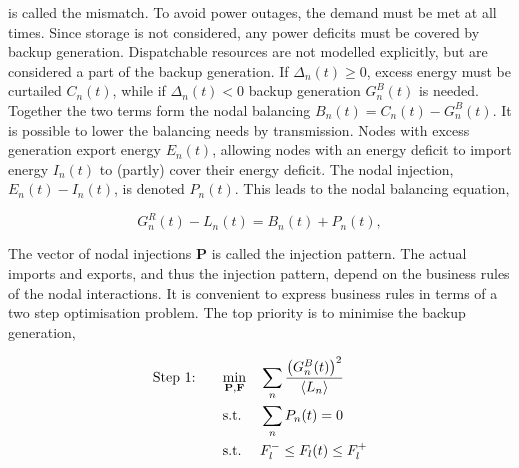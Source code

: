 \documentclass[a4paper, 5p, sort&compress]{elsarticle}%
\newcommand{\mean}[1]{\langle #1 \rangle}
\newcommand{\paren}[1]{\left(#1\right)}
\begin{document}
is called the mismatch. To avoid power outages, the demand must be
met at all times. Since storage is not considered, any power
deficits must be covered by backup generation. Dispatchable
resources are not modelled explicitly, but are considered a part of
the backup generation. If $\Delta_{n}(t) \geq 0$, excess energy must be
curtailed $C_{n}(t)$, while if $\Delta_{n}(t) < 0$ backup generation
$G^{B}_{n}(t)$ is needed. 
Together the two terms form the nodal balancing
$B_{n}(t) = C_{n}(t) - G^{B}_{n}(t)$. 
%
It is possible to lower the balancing needs by transmission. Nodes
with excess generation export energy $E_{n}(t)$, allowing nodes with
an energy deficit to import energy $I_{n}(t)$ to (partly) cover their
energy deficit. The nodal injection, $E_{n}(t) - I_{n}(t)$, is denoted
$P_{n}(t)$. This leads to the nodal balancing equation,

\begin{equation}
  \label{eq:nodal-balancing}
  G^{R}_{n}(t) - L_{n}(t) = B_{n}(t) + P_{n}(t), %
\end{equation}

The vector of nodal injections $\mathbf{P}$ is called the injection
pattern. The actual imports and exports, and thus the injection
pattern, depend on the business rules of the nodal interactions. It is
convenient to express business rules in terms of a two step
optimisation problem. The top priority is to minimise the backup
generation,

\begin{equation}
  \label{eq:step1}
  \begin{aligned}
    \text{Step 1: \hspace{15pt}}& \underset{\mathbf{P}, \mathbf{F}}{\text{min}}
    & & \sum_{n} \frac{\paren{G_{n}^{B}(t)}^{2}}{\mean{L_{n}}} \\
    & \text{s.t.}
    & & \sum_{n} P_{n} (t) = 0 \\ %
    & \text{s.t.}
    & & F_{l}^{-} \leq F_{l} (t) \leq F_{l}^{+}
  \end{aligned}
\end{equation}
\end{document}
